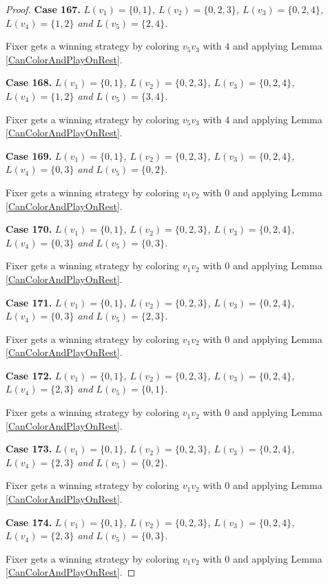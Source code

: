\documentclass[12pt]{amsart}
\theoremstyle{plain}
\theoremstyle{definition}
\theoremstyle{remark}
\begin{document}
\begin{proof}
\noindent\textbf{Case 167.  }\textit{$L(v_1) = \{0, 1\}$, $L(v_2) = \{0, 2, 3\}$, $L(v_3) = \{0, 2, 4\}$, $L(v_4) = \{1, 2\}$ and $L(v_5) = \{2, 4\}$.}

Fixer gets a winning strategy by coloring $v_5v_3$ with $4$ and applying Lemma \ref{CanColorAndPlayOnRest}.

\noindent\textbf{Case 168.  }\textit{$L(v_1) = \{0, 1\}$, $L(v_2) = \{0, 2, 3\}$, $L(v_3) = \{0, 2, 4\}$, $L(v_4) = \{1, 2\}$ and $L(v_5) = \{3, 4\}$.}

Fixer gets a winning strategy by coloring $v_5v_3$ with $4$ and applying Lemma \ref{CanColorAndPlayOnRest}.

\noindent\textbf{Case 169.  }\textit{$L(v_1) = \{0, 1\}$, $L(v_2) = \{0, 2, 3\}$, $L(v_3) = \{0, 2, 4\}$, $L(v_4) = \{0, 3\}$ and $L(v_5) = \{0, 2\}$.}

Fixer gets a winning strategy by coloring $v_1v_2$ with $0$ and applying Lemma \ref{CanColorAndPlayOnRest}.

\noindent\textbf{Case 170.  }\textit{$L(v_1) = \{0, 1\}$, $L(v_2) = \{0, 2, 3\}$, $L(v_3) = \{0, 2, 4\}$, $L(v_4) = \{0, 3\}$ and $L(v_5) = \{0, 3\}$.}

Fixer gets a winning strategy by coloring $v_1v_2$ with $0$ and applying Lemma \ref{CanColorAndPlayOnRest}.

\noindent\textbf{Case 171.  }\textit{$L(v_1) = \{0, 1\}$, $L(v_2) = \{0, 2, 3\}$, $L(v_3) = \{0, 2, 4\}$, $L(v_4) = \{0, 3\}$ and $L(v_5) = \{2, 3\}$.}

Fixer gets a winning strategy by coloring $v_1v_2$ with $0$ and applying Lemma \ref{CanColorAndPlayOnRest}.

\noindent\textbf{Case 172.  }\textit{$L(v_1) = \{0, 1\}$, $L(v_2) = \{0, 2, 3\}$, $L(v_3) = \{0, 2, 4\}$, $L(v_4) = \{2, 3\}$ and $L(v_5) = \{0, 1\}$.}

Fixer gets a winning strategy by coloring $v_1v_2$ with $0$ and applying Lemma \ref{CanColorAndPlayOnRest}.

\noindent\textbf{Case 173.  }\textit{$L(v_1) = \{0, 1\}$, $L(v_2) = \{0, 2, 3\}$, $L(v_3) = \{0, 2, 4\}$, $L(v_4) = \{2, 3\}$ and $L(v_5) = \{0, 2\}$.}

Fixer gets a winning strategy by coloring $v_1v_2$ with $0$ and applying Lemma \ref{CanColorAndPlayOnRest}.

\noindent\textbf{Case 174.  }\textit{$L(v_1) = \{0, 1\}$, $L(v_2) = \{0, 2, 3\}$, $L(v_3) = \{0, 2, 4\}$, $L(v_4) = \{2, 3\}$ and $L(v_5) = \{0, 3\}$.}

Fixer gets a winning strategy by coloring $v_1v_2$ with $0$ and applying Lemma \ref{CanColorAndPlayOnRest}.


\end{proof}
\end{document}

